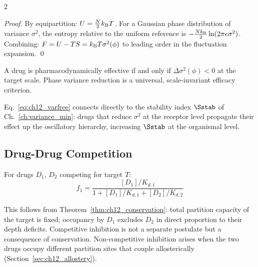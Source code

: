 \begin{multicols}{2}
\begin{proof}
By equipartition: $U = \frac{N}{2}k_{\mathrm{B}} T$. For a Gaussian phase distribution of variance $\sigma^2$, the entropy relative to the uniform reference is $-\frac{Nk_{\mathrm{B}}}{2}\ln(2\pi e\sigma^2)$. Combining: $F = U - TS = k_{\mathrm{B}} T\sigma^2(\phi)$ to leading order in the fluctuation expansion. \qed
\end{proof}

\begin{corollary}
A drug is pharmacodynamically effective if and only if $\Delta\sigma^2(\phi) < 0$ at the target scale. Phase variance reduction is a universal, scale-invariant efficacy criterion.
\end{corollary}

Eq.~\ref{eq:ch12_varfree} connects directly to the stability index $\Sstab$ of Ch.~\ref{ch:variance_min}: drugs that reduce $\sigma^2$ at the receptor level propagate their effect up the oscillatory hierarchy, increasing $\Sstab$ at the organismal level.

\subsection{Drug-Drug Competition}
\label{subsec:ch12_competition}

\begin{theorem}
For drugs $D_1$, $D_2$ competing for target $T$:
\begin{equation}
f_1 = \frac{[D_1]/K_{d,1}}{1 + [D_1]/K_{d,1} + [D_2]/K_{d,2}}
\label{eq:ch12_competition}
\end{equation}
\end{theorem}

This follows from Theorem~\ref{thm:ch12_conservation}: total partition capacity of the target is fixed; occupancy by $D_1$ excludes $D_2$ in direct proportion to their depth deficits. Competitive inhibition is not a separate postulate but a consequence of conservation. Non-competitive inhibition arises when the two drugs occupy different partition sites that couple allosterically (Section~\ref{sec:ch12_allostery}).

\end{multicols}

